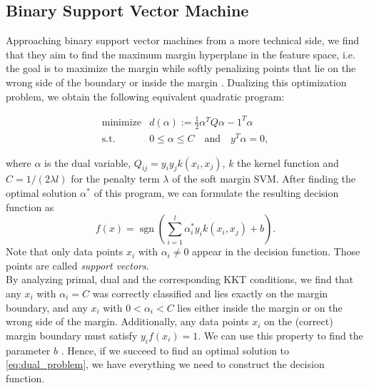 \subsection{Binary Support Vector Machine}


Approaching binary support vector machines from a more technical side, we find that they aim to find the maximum margin hyperplane in the feature space, i.e. the goal is to maximize the margin while softly penalizing points that lie on the wrong side of the boundary or inside the margin \cite{Bishop2006}. Dualizing this optimization problem, we obtain the following equivalent quadratic program:

\begin{eqnarray}
	\text{minimize} & d(\alpha) := \frac{1}{2} \alpha^T Q \alpha - 1^T \alpha \label{eq:dual_problem} \\ 
	\text{s.t.} &  0 \leq \alpha \leq C  \quad \text{and} \quad 	y^T \alpha = 0,	\nonumber
\end{eqnarray}

where $\alpha$ is the dual variable, $Q_{ij} = y_i y_j k(x_i,x_j)$, $k$ the kernel function and $C = 1/(2 \lambda l)$ for the penalty term $\lambda$ of the soft margin SVM.
After finding the optimal solution $\alpha^*$ of this program, we can formulate the resulting decision function as
\begin{equation*}
f(x) = \operatorname{sgn}\left(\sum_{i=1}^{l}\alpha^*_i y_i k(x_i,x_j)+b\right).
\end{equation*}
Note that only data points $x_i$ with $\alpha_i \neq 0$ appear in the decision function. Those points are called \textit{support vectors}.\\
By analyzing primal, dual and the corresponding KKT conditions, we find that any $x_i$ with $\alpha_i = C$ was correctly classified and lies exactly on the margin boundary, and any $x_i$ with $0<\alpha_i < C$ lies either inside the margin or on the wrong side of the margin. Additionally, any data points $x_i$ on the (correct) margin boundary must satisfy $y_i f(x_i) = 1$. We can use this property to find the parameter $b$ \cite{Bishop2006}. Hence, if we succeed to find an optimal solution to \eqref{eq:dual_problem}, we have everything we need to construct the decision function.


